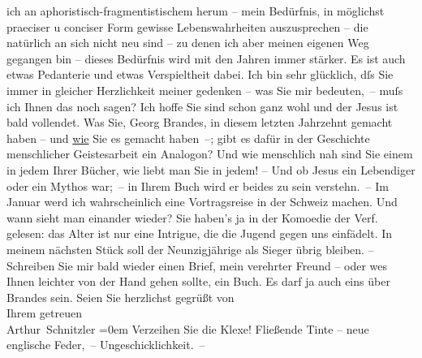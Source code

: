 \begin{ledgroupsized}[t]{13cm}
               ich an aphoristisch-fragmentistischem herum – mein Bedürfnis, in möglichst  praeciser u conciser Form gewisse Lebenswahrheiten
               auszusprechen – die natürlich an sich nicht neu sind – zu denen ich aber meinen
               eigenen Weg gegangen bin – dieses Bedürfnis wird mit den Jahren immer stärker. Es ist
               auch etwas Pedanterie und etwas Verspieltheit dabei.\pend
           \pstart
           Ich bin sehr glücklich, dſs Sie immer in gleicher Herzlichkeit meiner gedenken – was
               Sie mir bedeuten, – muſs ich Ihnen das noch sagen? Ich hoffe Sie sind schon ganz wohl
               und der Jesus ist bald vollendet. Was Sie, Georg Brandes, {\pb}in diesem letzten Jahrzehnt gemacht haben – und \uline{wie}
               Sie es gemacht haben –; gibt es dafür in der Geschichte menschlicher Geistesarbeit
               ein Analogon? Und wie menschlich nah sind Sie einem \introOben{}in\introOben{} jedem
               Ihrer Bücher, wie liebt man Sie in jedem! – Und ob Jesus ein Lebendiger oder ein Mythos war; – in Ihrem Buch wird er beides zu sein verstehn. –\pend
           \pstart
           Im Januar werd ich wahrscheinlich eine Vortragsreise in der Schweiz machen. Und wann sieht man einander wieder?
               Sie haben's ja in der Komoedie der Verf. gelesen:
               das Alter ist nur eine Intrigue, die die Jugend gegen uns einfädelt. In meinem
               nächsten Stück soll der
               Neunzigjährige als Sieger übrig bleiben.\pend
           \pstart
           {\pb}– Schreiben Sie mir bald wieder einen Brief, mein
               verehrter Freund – oder we{\geminationn}s Ihnen leichter von der Hand
               gehen sollte, ein Buch. Es darf ja auch eins über Brandes sein.\pend
           \pstart
           Seien Sie herzlichst gegrüßt von{\\[\baselineskip]}Ihrem getreuen{\\[\baselineskip]}\spacefill\mbox{Arthur Schnitzler}\pend
           \leftskip=0em{}\pstart
           \noindent{}Verzeihen Sie die Klexe! Fließende Tinte – neue englische Feder, – Ungeschicklichkeit. –\pend
           

\end{ledgroupsized}

